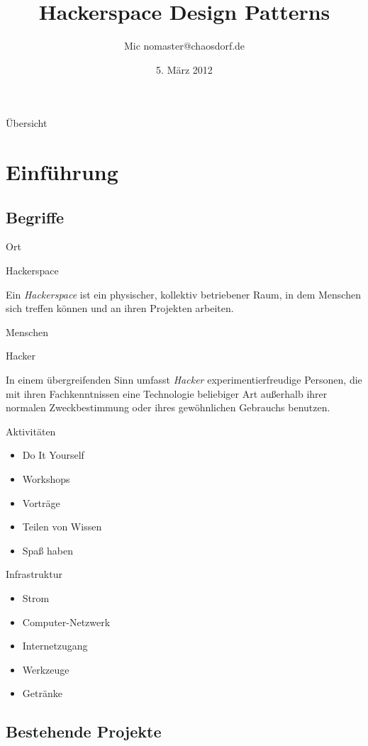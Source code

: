\documentclass{beamer}
\title{Hackerspace Design Patterns}
\author[Mic]{Mic \flq nomaster@chaosdorf.de\frq}
\institute[niemandsland]{Niemandsland e.V.}
\date[]{5. März 2012}
\newcommand{\concept}[2]{
  \begin{block}{#1}
    #2
  \end{block}
}
\newcommand\startitemizeframe{\begin{itemize}}
\newcommand\stopitemizeframe{\end{itemize}}
\newenvironment{itemizeframe}[1]
  {\begin{frame}{#1}\startitemizeframe}
  {\stopitemizeframe\end{frame}}
\begin{document}
  \begin{frame}
    \titlepage
  \end{frame}

  \begin{frame}{Übersicht}
    \tableofcontents
  \end{frame}

  \section{Einführung}

  \subsection{Begriffe}

  \begin{frame}{Ort}
    \concept{Hackerspace}{
      Ein \textsl{Hackerspace} ist ein physischer, kollektiv betriebener Raum,
      in dem Menschen sich treffen können und an ihren Projekten arbeiten.
    }
  \end{frame}

  \begin{frame}{Menschen}
    \concept{Hacker}{
      In einem übergreifenden Sinn umfasst \textsl{Hacker}
      experimentierfreudige Personen, die mit ihren Fachkenntnissen eine
      Technologie beliebiger Art außerhalb ihrer normalen Zweckbestimmung oder
      ihres gewöhnlichen Gebrauchs benutzen.
    }
  \end{frame}

  \begin{itemizeframe}{Aktivitäten}
    \item Do It Yourself
    \item Workshops
    \item Vorträge
    \item Teilen von Wissen
    \item Spaß haben
  \end{itemizeframe}

  \begin{itemizeframe}{Infrastruktur}
    \item Strom
    \item Computer-Netzwerk
    \item Internetzugang
    \item Werkzeuge
    \item Getränke
  \end{itemizeframe}

  \subsection{Bestehende Projekte}
\end{document}
